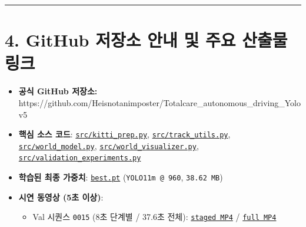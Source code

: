 \documentclass[10.5pt,a4paper]{article}
\begin{document}
\par\noindent\rule{\textwidth}{0.4pt}\par\medskip

\section{4. GitHub 저장소 안내 및 주요 산출물 링크}

\begin{itemize}[leftmargin=1.5em,itemsep=2pt]
\item \textbf{공식 GitHub 저장소:} https:\allowbreak{}/\allowbreak{}/\allowbreak{}github.\allowbreak{}com/\allowbreak{}Heisnotanimposter/\allowbreak{}Totalcare\_\allowbreak{}autonomous\_\allowbreak{}driving\_\allowbreak{}Yolov5
\item \textbf{핵심 소스 코드}: \href{https://github.com/Heisnotanimposter/Totalcare\_autonomous\_driving\_Yolov5/blob/main/src/kitti\_prep.py}{\texttt{src/\allowbreak{}kitti\_\allowbreak{}prep.\allowbreak{}py}}, \href{https://github.com/Heisnotanimposter/Totalcare\_autonomous\_driving\_Yolov5/blob/main/src/track\_utils.py}{\texttt{src/\allowbreak{}track\_\allowbreak{}utils.\allowbreak{}py}}, \href{https://github.com/Heisnotanimposter/Totalcare\_autonomous\_driving\_Yolov5/blob/main/src/world\_model.py}{\texttt{src/\allowbreak{}world\_\allowbreak{}model.\allowbreak{}py}}, \href{https://github.com/Heisnotanimposter/Totalcare\_autonomous\_driving\_Yolov5/blob/main/src/world\_visualizer.py}{\texttt{src/\allowbreak{}world\_\allowbreak{}visualizer.\allowbreak{}py}}, \href{https://github.com/Heisnotanimposter/Totalcare\_autonomous\_driving\_Yolov5/blob/main/src/validation\_experiments.py}{\texttt{src/\allowbreak{}validation\_\allowbreak{}experiments.\allowbreak{}py}}
\item \textbf{학습된 최종 가중치}: \href{https://github.com/Heisnotanimposter/Totalcare\_autonomous\_driving\_Yolov5/blob/main/results/v2\_improved/outputs/weights/best.pt}{\texttt{best.\allowbreak{}pt}} (\texttt{YOLO11m @ 960}, \texttt{38.\allowbreak{}62 MB})
\item \textbf{시연 동영상 (5초 이상)}:
\begin{itemize}[leftmargin=1.5em,itemsep=2pt]
\item Val 시퀀스 \texttt{0015} (8초 단계별 / 37.6초 전체): \href{https://github.com/Heisnotanimposter/Totalcare\_autonomous\_driving\_Yolov5/blob/main/results/v3\_bev\_fixed/world\_outputs/world\_model\_0015\_staged/world\_model\_demo\_0015.mp4}{\texttt{staged MP4}} / \href{https://github.com/Heisnotanimposter/Totalcare\_autonomous\_driving\_Yolov5/blob/main/results/v3\_bev\_fixed/world\_outputs/world\_model\_0015\_full/world\_model\_demo\_0015.mp4}{\texttt{full MP4}}

\end{itemize}
\end{itemize}
\end{document}

